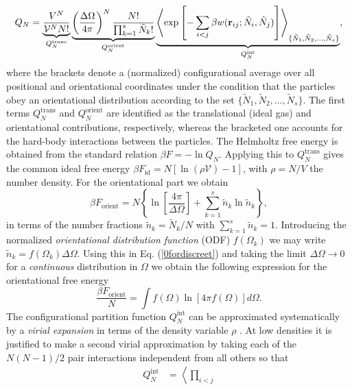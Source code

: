 {\begin{equation}
Q_{N}= \underbrace{\frac{V^{N}}{\mathcal{V} ^{N} N!}}_{Q_{N}^{\text{trans}}}
\underbrace{\left(\frac{\Delta \Omega}{4\pi}\right)^{N}
\frac{N!}{\prod_{k=1}^{s}\tilde{N}_{k}!}}_{Q_{N}^{\text{orient}}}
\underbrace{\left < \exp\left[-\sum_{i<j}\beta w({\bf r}_{ij};
\tilde{N}_{i},\tilde{N}_{j})\right] \right >_{\{\tilde{N}_{1},\tilde{N}_{2},\ldots,\tilde{N}_{s}\}}
}_{Q_{N}^{\text{int}}},
\end{equation}
where the brackets denote a (normalized) configurational average over all positional and orientational
coordinates under the condition that the particles obey an orientational distribution
according to the set $\{\tilde{N}_{1},\tilde{N}_{2},\ldots,\tilde{N}_{s}\}$.
The first terms $Q_{N}^{\text{trans}}$ and $Q_{N}^{\text{orient}}$ are  identified as the translational (ideal gas) and
orientational contributions, respectively, whereas the bracketed one accounts for the hard-body interactions between
the particles.
The Helmholtz free energy is obtained from the standard relation $\beta F= -\ln Q_{N}$.
Applying this to $Q_{N}^{\text{trans}}$ gives the common ideal free energy
$\beta F_{\text{id}}= N\left[\ln (\rho \mathcal{V})-1\right]$, with $\rho=N/V$ the number density.
For the orientational part we obtain
\begin{equation}
\beta F_{\text{orient}}=N\left\{\ln \left[\frac{4\pi}{\Delta \Omega}\right] + \sum_{k=1}^{s}\tilde{n}_{k}\ln \tilde{n}_{k} \right\},
\label{0fordiscreet}
\end{equation}
in terms of the number fractions $\tilde{n}_{k}=\tilde{N}_{k}/N$ with $\sum_{k=1}^{s}\tilde{n}_{k}=1$.
Introducing the normalized {\em orientational distribution function} (ODF) $f(\Omega_{k})$ we may
write $\tilde{n}_{k}=f(\Omega_{k})\Delta\Omega$. Using this in Eq. (\ref{0fordiscreet}) and
taking the  limit $\Delta \Omega \rightarrow 0$ for a {\em continuous} distribution in $\Omega$ we
obtain the following expression for the orientational free  energy
\begin{equation}
\frac{\beta F_{\text{orient}}}{N}=\int f(\Omega)\ln \left[4\pi f(\Omega)\right]d\Omega.
\label{0forient}
\end{equation}
The configurational partition function  $Q_{N}^{\text{int}}$ can be approximated
systematically by a {\em virial expansion} in terms of the density variable $\rho$ \cite{hansenmacdonald}.
At low densities it is justified to make a second virial approximation   by taking each of the $N(N-1)/2$ pair interactions independent from all others
so that
\begin{align}
Q_{N}^{\text{int}}&= \left \langle \prod _{i<j}

\end{align}}
